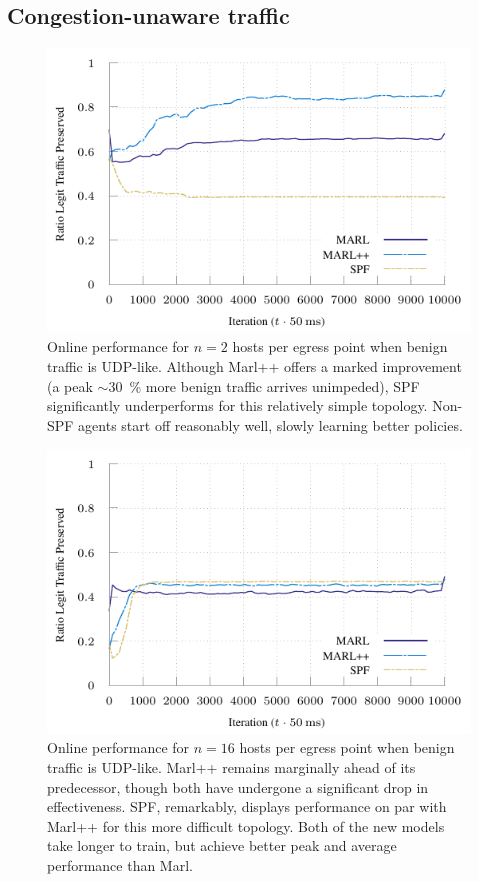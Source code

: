 \documentclass[conference, letterpaper, 10pt, times]{IEEEtran}
\begin{document}
\subsection{Congestion-unaware traffic}
\begin{figure}
	\centering
	\includegraphics[width=0.9\linewidth]{../plots/udp-2}
	
	\caption{
		Online performance for $n=2$ hosts per egress point when benign traffic is UDP-like.
		Although Marl++ offers a marked improvement (a peak $\sim$\SI{30}{\percent} more benign traffic arrives unimpeded), SPF significantly underperforms for this relatively simple topology.
		Non-SPF agents start off reasonably well, slowly learning better policies.
		\label{fig:udp-2}
	}
\end{figure}
\begin{figure}
	\centering
	\includegraphics[width=0.9\linewidth]{../plots/udp-16}
	
	\caption{
		Online performance for $n=16$ hosts per egress point when benign traffic is UDP-like.
		Marl++ remains marginally ahead of its predecessor, though both have undergone a significant drop in effectiveness.
		SPF, remarkably, displays performance on par with Marl++ for this more difficult topology.
		Both of the new models take longer to train, but achieve better peak and average performance than Marl.
		\label{fig:udp-16}
	}
\end{figure}
\end{document}
